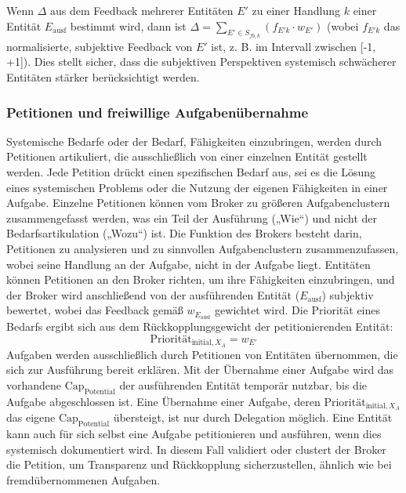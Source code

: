 \documentclass[12pt]{scrartcl}
\begin{document}
Wenn $\Delta$ aus dem Feedback mehrerer Entitäten $E'$ zu einer Handlung $k$ einer Entität $E_{\text{ausf}}$ bestimmt wird, dann ist $\Delta = \sum_{E' \in S_{fb,k}} (f_{E'k} \cdot w_{E'})$ (wobei $f_{E'k}$ das normalisierte, subjektive Feedback von $E'$ ist, z. B. im Intervall zwischen [-1, +1]). Dies stellt sicher, dass die subjektiven Perspektiven systemisch schwächerer Entitäten stärker berücksichtigt werden.

\subsubsection{Petitionen und freiwillige Aufgabenübernahme}
\label{sec:PetitionenFinal}
Systemische Bedarfe oder der Bedarf, Fähigkeiten einzubringen, werden durch Petitionen artikuliert, die ausschließlich von einer einzelnen Entität gestellt werden. Jede Petition drückt einen spezifischen Bedarf aus, sei es die Lösung eines systemischen Problems oder die Nutzung der eigenen Fähigkeiten in einer Aufgabe. Einzelne Petitionen können vom Broker zu größeren Aufgabenclustern zusammengefasst werden, was ein Teil der Ausführung („Wie“) und nicht der Bedarfsartikulation („Wozu“) ist. Die Funktion des Brokers besteht darin, Petitionen zu analysieren und zu sinnvollen Aufgabenclustern zusammenzufassen, wobei seine Handlung an der Aufgabe, nicht in der Aufgabe liegt. Entitäten können Petitionen an den Broker richten, um ihre Fähigkeiten einzubringen, und der Broker wird anschließend von der ausführenden Entität ($E_{\text{ausf}}$) subjektiv bewertet, wobei das Feedback gemäß $w_{E_{\text{ausf}}}$ gewichtet wird. Die Priorität eines Bedarfs ergibt sich aus dem Rückkopplungsgewicht der petitionierenden Entität:
\begin{equation}
\text{Priorität}_{\text{initial}, X_A} = w_{E'}
\label{eq:PetitionPrioritätFinal}
\end{equation}
Aufgaben werden ausschließlich durch Petitionen von Entitäten übernommen, die sich zur Ausführung bereit erklären. Mit der Übernahme einer Aufgabe wird das vorhandene $\text{Cap}_{\text{Potential}}$ der ausführenden Entität temporär nutzbar, bis die Aufgabe abgeschlossen ist. Eine Übernahme einer Aufgabe, deren $\text{Priorität}_{\text{initial}, X_A}$ das eigene $\text{Cap}_{\text{Potential}}$ übersteigt, ist nur durch Delegation möglich. Eine Entität kann auch für sich selbst eine Aufgabe petitionieren und ausführen, wenn dies systemisch dokumentiert wird. In diesem Fall validiert oder clustert der Broker die Petition, um Transparenz und Rückkopplung sicherzustellen, ähnlich wie bei fremdübernommenen Aufgaben.
\end{document}
